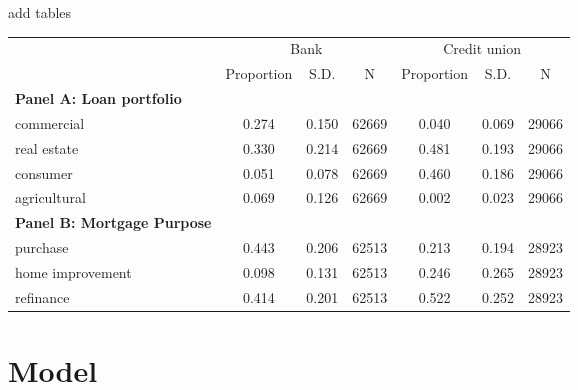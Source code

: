 \documentclass[notes,11pt, aspectratio=169]{beamer}
\begin{document}
\begin{frame}{add tables}
\begin{table}
\centering
\begin{adjustbox}{max width=0.8\textwidth}
\begin{tabular}{l*{6}{c}}
\toprule
&\multicolumn{3}{c}{Bank}&\multicolumn{3}{c}{Credit union}\\
\cmidrule(lr){2-4}\cmidrule(lr){5-7}
&\multicolumn{1}{c}{Proportion}&\multicolumn{1}{c}{S.D.}&\multicolumn{1}{c}{N}&\multicolumn{1}{c}{Proportion}&\multicolumn{1}{c}{S.D.}&\multicolumn{1}{c}{N} \\
\midrule
  \textbf{Panel A: Loan portfolio} & & & & & & \\
  commercial&       0.274&       0.150&       62669&       0.040&       0.069&       29066\\
  real estate&       0.330&       0.214&       62669&       0.481&       0.193&       29066\\
  consumer&       0.051&       0.078&       62669&       0.460&       0.186&       29066\\
  agricultural&       0.069&       0.126&       62669&       0.002&       0.023&       29066\\
  \midrule
  \textbf{Panel B: Mortgage Purpose} & & & & & & \\
  purchase  &       0.443&       0.206&       62513&       0.213&       0.194&       28923\\
  home improvement &       0.098&       0.131&       62513&       0.246&       0.265&       28923\\
  refinance      &       0.414&       0.201&       62513&       0.522&       0.252&       28923\\
  \bottomrule
\end{tabular}
\end{adjustbox}
\end{table}
\end{frame}



\section{Model}
\end{document}
